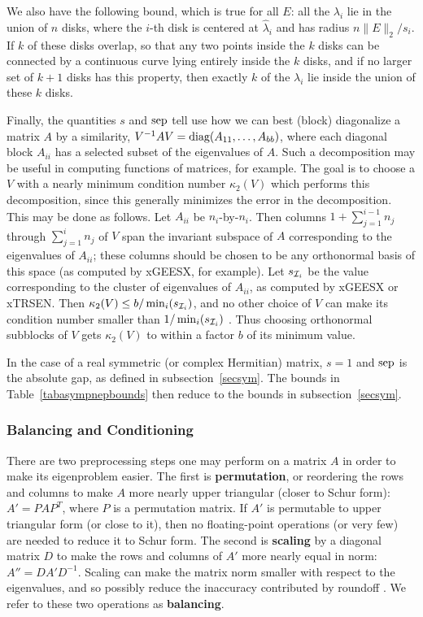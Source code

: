 We also have the following bound, which is true for all $E$:
all the $\lambda_i$ lie in the union of $n$ disks,
where the $i$-th disk is centered at $\hat{\lambda}_i$ and has
radius $n \|E\|_2 / s_i$. If $k$ of these disks overlap,
so that any two points inside the $k$ disks can be connected
by a continuous curve lying entirely inside the $k$ disks,
and if no larger set of $k+1$ disks has this property,
then exactly $k$ of the $\lambda_i$ lie inside the
union of these $k$ disks. 

Finally, the quantities $s$ and ${\rm sep}$ tell use how we can best
(block) diagonalize a matrix $A$ by a similarity,
$V^{-1}AV = {\mbox {\rm diag}} (A_{11} , \ldots , A_{bb})$, where each diagonal block
$A_{ii}$ has a selected subset of the eigenvalues of $A$. Such a decomposition
may be useful in computing functions of matrices, for example.
The goal is to choose a $V$ with a nearly minimum condition number
$\kappa_2 (V)$
which performs this decomposition, since this generally minimizes the error
in the decomposition.
This may be done as follows. Let $A_{ii}$ be
$n_i$-by-$n_i$. Then columns $1+\sum_{j=1}^{i-1} n_j$ through
$\sum_{j=1}^{i} n_j$ of $V$ span the invariant
subspace of $A$ corresponding
to the eigenvalues of $A_{ii}$; these columns should be chosen to be any
orthonormal basis of this space (as computed by xGEESX, for example).
Let $s_{{\cal I}_i}$ be the value corresponding to the
cluster of
eigenvalues of $A_{ii}$, as computed by xGEESX or xTRSEN. Then
$\kappa_2 (V) \leq b/ \min_i (s_{{\cal I}_i})$, and no other choice of $V$ can make
its condition number smaller than $1/ \min_i (s_{{\cal I}_i})$ \cite{demmel83}.
Thus choosing orthonormal
subblocks of $V$ gets $\kappa_2 (V)$ to within a factor $b$ of its minimum
value.

In the case of a real symmetric (or complex Hermitian) matrix,
$s=1$ and ${\rm sep}$ is the absolute gap, as defined in subsection~\ref{secsym}.
The bounds in Table~\ref{tabasympnepbounds} then reduce to the
bounds in subsection~\ref{secsym}.

\subsubsection{Balancing and Conditioning}\label{secbalance}

There are two preprocessing
steps one may perform
on a matrix $A$ in order
to make its eigenproblem easier. The first is {\bf permutation}, or
reordering the rows and columns to make $A$ more nearly upper triangular
(closer to Schur form): $A' = PAP^T$, where $P$ is a permutation matrix.
If $A'$ is permutable to upper triangular form (or close to it), then
no floating-point operations (or very few) are needed to reduce it to
Schur form.
The second is {\bf scaling} by a diagonal matrix $D$ to make the rows and
columns of $A'$ more nearly equal in norm: $A''= DA'D^{-1}$. Scaling
can make the matrix norm smaller with respect to the eigenvalues, and so
possibly reduce the inaccuracy contributed by roundoff
\cite[Chap. II/11]{wilkinson3}. We refer to these two operations as
{\bf balancing}.

